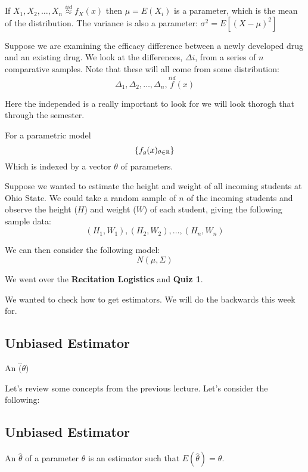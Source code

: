 \documentclass[11pt]{article}
\begin{document}
\begin{fact}
	If $X_1, X_2, \ldots, X_n \overset{iid}{\approx} f_X(x)$ then \(\mu  = E(X_i)\) is a parameter, which is the mean of the distribution. The variance is also a parameter: \(\sigma^2 = E[(X - \mu)^2]\)
\end{fact}

\begin{example}
	Suppose we are examining the efficacy difference between a newly developed drug and an existing drug. We look at the differences, $\Delta i$, from a series of $n$ comparative samples. Note that these will all come from some distribution:
	\[ \Delta_1, \Delta_2, \ldots, \Delta_n, \overset{iid} f(x)\]

\end{example}
\begin{fact}
	Here the independed is a really important to look for we will look thorogh that through the semester.
\end{fact}
For a parametric model\[\{f_g(x)_{\theta \in \mathbb R}\}\]
Which is indexed by a vector $\theta$ of parameters.

\begin{example}
	Suppose we wanted to estimate the height and weight of all incoming students at Ohio State. We could take a random sample of \(n\) of the incoming students and observe the height (\(H\)) and weight (\(W\)) of each student, giving the following sample data:
	\[
		(H_1, W_1), (H_2, W_2), \dots, (H_n, W_n)
	\]
\end{example}
We can then consider the following model:
\[
	{N(\mu, \Sigma)}
\]


We went over the \textbf{Recitation Logistics} and \textbf{Quiz 1}.

We wanted to check how to get estimators. We will do the backwards this week for.

\subsection{Unbiased Estimator}
\begin{definition}
	An  \(\hat(\theta) \)
\end{definition}


Let's review some concepts from the previous lecture. Let's consider the following:
\subsection{Unbiased Estimator}
\begin{definition}
	An  $\hat{\theta}$ of a parameter $\theta$ is an estimator such that $E(\hat{\theta}) = \theta$.
\end{definition}
\end{document}
